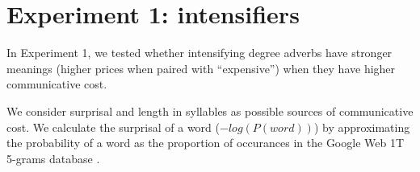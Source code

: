 \documentclass[10pt,letterpaper]{article}
\begin{document}
% 
% 
% 
\section{Experiment 1: intensifiers}

  In Experiment 1, we tested whether intensifying degree adverbs have stronger meanings (higher prices when paired with ``expensive'') when they have higher communicative cost.
  
  We consider surprisal and length in syllables as possible sources of communicative cost. We calculate the surprisal of a word ($-log(P(word))$) by approximating the probability of a word as the proportion of occurances in the Google Web 1T 5-grams database \cite{web1t5gram}.
  
\end{document}
